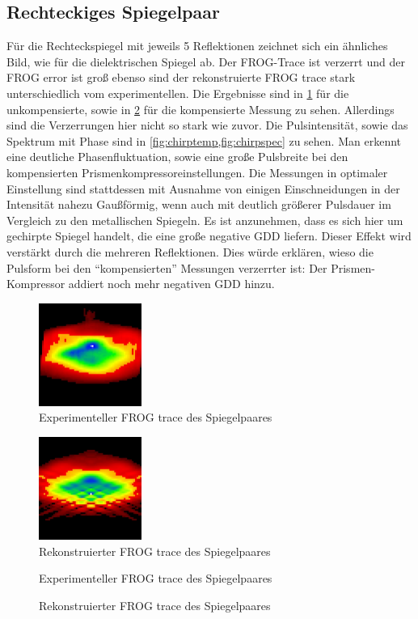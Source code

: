 \documentclass[twoside,        %
               BCOR12mm,       %
               english,ngerman, %
               fleqn,headsepline=false,footsepline=false
              ]{Vorlage/MFPREPORT}
\begin{document}
\subsection{Rechteckiges Spiegelpaar}
Für die Rechteckspiegel mit jeweils 5 Reflektionen zeichnet sich ein ähnliches
Bild, wie für die dielektrischen Spiegel ab. Der FROG-Trace ist verzerrt
und der FROG error ist groß ebenso sind der rekonstruierte FROG trace stark
unterschiedlich vom experimentellen. Die Ergebnisse sind in \cref{fig:chirpspiegel1}
für die unkompensierte, sowie in \cref{fig:chirpspiegel2} für die kompensierte
Messung zu sehen. Allerdings sind die Verzerrungen hier nicht so stark wie
zuvor. Die Pulsintensität, sowie das Spektrum mit Phase sind in
\cref{fig:chirptemp,fig:chirpspec} zu sehen. Man erkennt eine deutliche
Phasenfluktuation, sowie eine große Pulsbreite bei den kompensierten
Prismenkompressoreinstellungen. Die Messungen in optimaler Einstellung sind
stattdessen mit Ausnahme von einigen Einschneidungen in der Intensität nahezu
Gaußförmig, wenn auch mit deutlich größerer Pulsdauer im Vergleich zu den 
metallischen Spiegeln. Es ist anzunehmen, dass es sich hier um gechirpte
Spiegel handelt, die eine große negative GDD liefern. Dieser Effekt wird
verstärkt durch die mehreren Reflektionen. Dies würde erklären, wieso die
Pulsform bei den ``kompensierten'' Messungen verzerrter ist: Der
Prismen-Kompressor addiert noch mehr negativen GDD hinzu.


\begin{figure}[]
    \centering
    \includegraphics[width=0.3\textwidth]{chirpsp1.jpg}
    \caption{Experimenteller FROG trace des Spiegelpaares}
    \label{fig:chirpspiegel1}
\end{figure}
\begin{figure}[]
    \centering
    \includegraphics[width=0.3\textwidth]{chirpsp2.jpg}
    \caption{Rekonstruierter FROG trace des Spiegelpaares}
    \label{fig:chirpspiegel2}
\end{figure}
\begin{figure}[]
    \centering
    
    \caption{Experimenteller FROG trace des Spiegelpaares}
    \label{fig:chirptemp}
\end{figure}
\begin{figure}[]
    \centering
    
    \caption{Rekonstruierter FROG trace des Spiegelpaares}
    \label{fig:chirpspec}
\end{figure}
\end{document}
